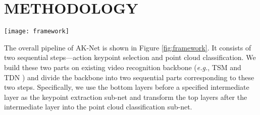 \documentclass[journal]{IEEEtran}
\begin{document}
\section{METHODOLOGY}\label{sec:method}

\begin{figure*}[ht]
	\centering
	\texttt{[image: framework]}
	\caption{
	Overview of the proposed AK-Net. 
	It is built on the existing video recognition backbone and the whole network is divided into two parts.
	The first part aims to select action keypoints by utilizing the spatial-temporal heatmap.
	An auxiliary classification head is introduced to facilitate the optimization of all point features.
	Then a set of spatial-temporal points are selected via the score of the heatmap. 
	The selected action keypoints will be processed by the second part, which is composed of ranking, transform, and 1D convolution layers.
	}
	\label{fig:framework}
\end{figure*}

The overall pipeline of AK-Net is shown in Figure \ref{fig:framework}.
It consists of two sequential steps---action keypoint selection and point cloud classification.
We build these two parts on existing video recognition backbone (\emph{e.g.}, TSM \cite{lin2019tsm} and TDN \cite{wang2021tdn}) and divide the backbone into two sequential parts corresponding to these two steps. Specifically, we use the bottom layers before a specified intermediate layer as the keypoint extraction sub-net and transform the top layers after the intermediate layer into the point cloud classification sub-net. 
\end{document}

